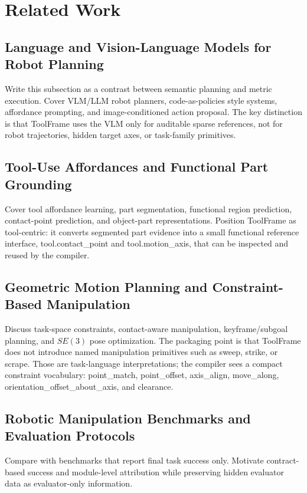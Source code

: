 \documentclass[journal]{IEEEtran}
\newcommand{\method}{ToolFrame}
\begin{document}
\section{Related Work}
\subsection{Language and Vision-Language Models for Robot Planning}
Write this subsection as a contrast between semantic planning and metric
execution. Cover VLM/LLM robot planners, code-as-policies style systems,
affordance prompting, and image-conditioned action proposal. The key distinction
is that \method{} uses the VLM only for auditable sparse references, not for
robot trajectories, hidden target axes, or task-family primitives.

\subsection{Tool-Use Affordances and Functional Part Grounding}
Cover tool affordance learning, part segmentation, functional region
prediction, contact-point prediction, and object-part representations. Position
\method{} as tool-centric: it converts segmented part evidence into a small
functional reference interface, tool.contact\_point and tool.motion\_axis, that
can be inspected and reused by the compiler.

\subsection{Geometric Motion Planning and Constraint-Based Manipulation}
Discuss task-space constraints, contact-aware manipulation, keyframe/subgoal
planning, and $SE(3)$ pose optimization. The packaging point is that \method{}
does not introduce named manipulation primitives such as sweep, strike, or
scrape. Those are task-language interpretations; the compiler sees a compact
constraint vocabulary: point\_match, point\_offset, axis\_align, move\_along,
orientation\_offset\_about\_axis, and clearance.

\subsection{Robotic Manipulation Benchmarks and Evaluation Protocols}
Compare with benchmarks that report final task success only. Motivate
contract-based success and module-level attribution while preserving hidden
evaluator data as evaluator-only information.
\end{document}

